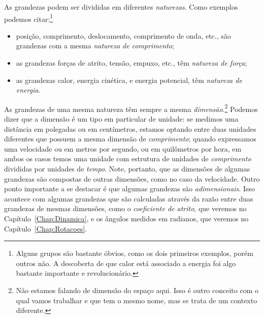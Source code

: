 As grandezas podem ser divididas em diferentes \emph{naturezas}. Como exemplos podemos citar:\footnote{Alguns grupos são bastante óbvios, como os dois primeiros exemplos, porém outros não. A descoberta de que calor está associado a energia foi algo bastante importante e revolucionário.} 
\begin{itemize}
    \item posição, comprimento, deslocamento, comprimento de onda, etc., são grandezas com a mesma \emph{natureza de comprimento};
    \item as grandezas forças de atrito, tensão, empuxo, etc., têm \emph{natureza de força};
    \item as grandezas calor, energia cinética, e energia potencial, têm \emph{natureza de energia}.
\end{itemize}

As grandezas de uma mesma natureza têm sempre a mesma \emph{dimensão}.\footnote{Não estamos falando de dimensão do espaço aqui. Isso é outro conceito com o qual vamos trabalhar e que tem o mesmo nome, mas se trata de um contexto diferente.} Podemos dizer que a dimensão é um tipo em particular de unidade: se medimos uma distância em polegadas ou em centímetros, estamos optando entre duas unidades diferentes que possuem a mesma dimensão de \emph{comprimento}; quando expressamos uma velocidade ou em metros por segundo, ou em quilômetros por hora, em ambos os casos temos uma unidade com estrutura de unidades de \emph{comprimento} divididas por unidades de \emph{tempo}. Note, portanto, que as dimensões de algumas grandezas são compostas de outras dimensões, como no caso da velocidade. Outro ponto importante a se destacar é que algumas grandezas são \emph{adimensionais}. Isso acontece com algumas grandezas que são calculadas através da razão entre duas grandezas de mesmas dimensões, como o \emph{coeficiente de atrito}, que veremos no Capítulo~\ref{Chap:Dinamica}, e os ângulos medidos em radianos, que veremos no Capítulo~\ref{Chap:Rotacoes}.

